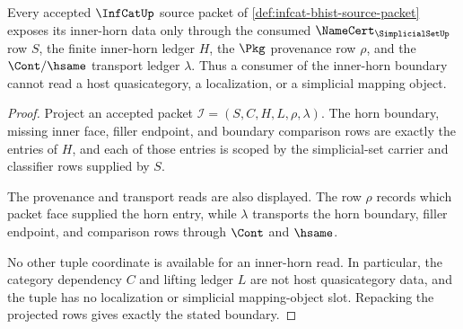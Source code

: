 \begin{theorem}
\label{thm:infcat-inner-horn-ledger-boundary}
Every accepted $\InfCatUp$ source packet of
\autoref{def:infcat-bhist-source-packet} exposes its inner-horn data only
through the consumed $\NameCert_{\SimplicialSetUp}$ row $S$, the finite
inner-horn ledger $H$, the $\Pkg$ provenance row $\rho$, and the
$\Cont/\hsame$ transport ledger $\lambda$. Thus a consumer of the
inner-horn boundary cannot read a host quasicategory, a localization, or a
simplicial mapping object.
\end{theorem}
\begin{proof}
Project an accepted packet
$\mathcal{I}=(S,C,H,L,\rho,\lambda)$. The horn boundary, missing inner face,
filler endpoint, and boundary comparison rows are exactly the entries of
$H$, and each of those entries is scoped by the simplicial-set carrier and
classifier rows supplied by $S$.

The provenance and transport reads are also displayed. The row $\rho$ records
which packet face supplied the horn entry, while $\lambda$ transports the
horn boundary, filler endpoint, and comparison rows through $\Cont$ and
$\hsame$.

No other tuple coordinate is available for an inner-horn read. In particular,
the category dependency $C$ and lifting ledger $L$ are not host
quasicategory data, and the tuple has no localization or simplicial
mapping-object slot. Repacking the projected rows gives exactly the stated
boundary.
\end{proof}

